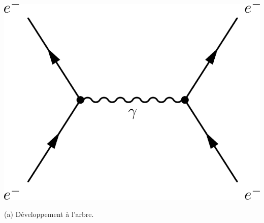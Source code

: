 \begin{minipagewithmarginpars}[h]{\textwidth}
\vspace{-0.5cm}
\centering
\hspace*{-1.5cm}

\label{bestiaire}
\marginpar
{
\vspace*{1.5cm}
\begin{center}
\includegraphics[width=\marginparwidth]{SM/feyn0.png}
\begin{center}\normalfont\small {(a) Développement à l'arbre.}\end{center}
\end{center}
}
\end{minipagewithmarginpars}
